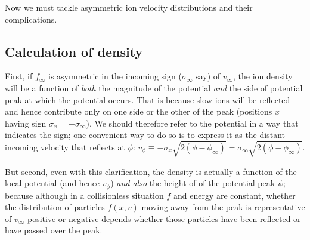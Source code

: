 \documentclass[12pt]{article}
\begin{document}
Now we must tackle asymmetric ion velocity distributions and their
complications.

\subsection{Calculation of density}

First, if $f_\infty$ is asymmetric in the incoming sign ($\sigma_\infty$ say)
of $v_\infty$, the ion density will be a function of \emph{both} the
magnitude of the potential \emph{and} the side of potential peak at
which the potential occurs. That is because slow ions will be
reflected and hence contribute only on one side or the other of the
peak (positions $x$ having sign $\sigma_x=-\sigma_\infty$). We should
therefore refer to the potential in a way that indicates the sign; one
convenient way to do so is to express it as the distant incoming
velocity that reflects at $\phi$:
$v_\phi\equiv-\sigma_x\sqrt{2(\phi-\phi_\infty)}=\sigma_\infty\sqrt{2(\phi-\phi_\infty)}$.

But second, even with this clarification, the density is actually a
function of the local potential (and hence $v_\phi$) \emph{and also} the
height of of the potential peak $\psi$; because although in a
collisionless situation $f$ and energy are constant, whether the
distribution of particles $f(x,v)$ moving away from the peak is
representative of $v_\infty$ positive or negative depends whether
those particles have been reflected or have passed over the peak.
\end{document}
